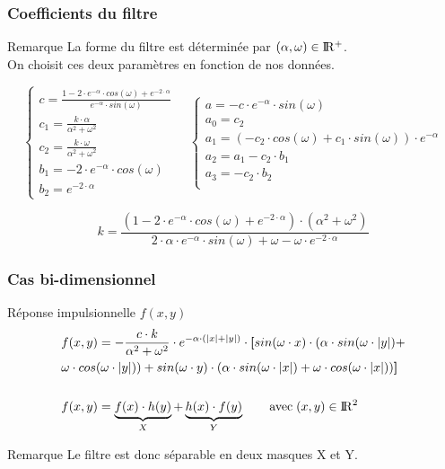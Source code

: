 \documentclass{beamer}
\begin{document}
\begin{frame}
\frametitle{Coefficients du filtre}

\begin{alertblock}{Remarque}
La forme du filtre est déterminée par $ (\alpha, \omega) \in \rm I\!R^+ $. \\
On choisit ces deux paramètres en fonction de nos données. \\
\end{alertblock}

\[ \left\{\begin{array}{ll}
c= \frac{1-2 \cdot e^{-\alpha} \cdot cos(\omega) + e^{-2 \cdot \alpha}}{e^{-\alpha} \cdot sin(\omega)} \\
c_1 = \frac{k \cdot \alpha}{\alpha^2 + \omega^2} \\
c_2 = \frac{k \cdot \omega}{\alpha^2 + \omega^2} \\
b_1 = -2 \cdot e^{-\alpha} \cdot cos(\omega) \\
b_2 = e^{-2 \cdot \alpha}
\end{array}\right.
\quad
\left\{\begin{array}{ll}
a = -c \cdot e^{-\alpha} \cdot sin(\omega) \\
a_0 = c_2 \\
a_1 = (-c_2 \cdot cos(\omega) + c_1 \cdot sin(\omega)) \cdot e^{-\alpha} \\
a_2 = a_1 - c_2 \cdot b_1 \\
a_3 = -c_2 \cdot b_2 \\
\end{array}\right. \]

\[ k = \frac{(1-2 \cdot e^{-\alpha} \cdot cos(\omega) + e^{-2 \cdot \alpha}) \cdot (\alpha^2 + \omega^2)}{2 \cdot \alpha \cdot e^{-\alpha} \cdot sin(\omega) + \omega - \omega \cdot e^{-2 \cdot \alpha}} \]
\end{frame}

\begin{frame}
\frametitle{Cas bi-dimensionnel}

\begin{block}{Réponse impulsionnelle $ f(x,y) $}
\begin{align*}
& f(x,y) = -\frac{c \cdot k}{\alpha^2 + \omega^2} \cdot e^{- \alpha \cdot (|x| + |y|)} \cdot \textbf{[} sin(\omega \cdot x) \cdot (\alpha \cdot sin(\omega \cdot |y|) + \\
& \omega \cdot cos(\omega \cdot |y|)) + sin(\omega \cdot y) \cdot (\alpha \cdot sin(\omega \cdot |x|) + \omega \cdot cos(\omega \cdot |x|)) \textbf{]} \\
& \\
&  f(x,y) = \underbrace{f(x) \cdot h(y)}_{X} + \underbrace{h(x) \cdot f(y)}_{Y} \qquad \text{avec} \; (x,y) \in \rm I\!R^2 \\
\end{align*}
\end{block}

\begin{alertblock}{Remarque}
Le filtre est donc séparable en deux masques X et Y.
\end{alertblock}

\end{frame}
\end{document}
